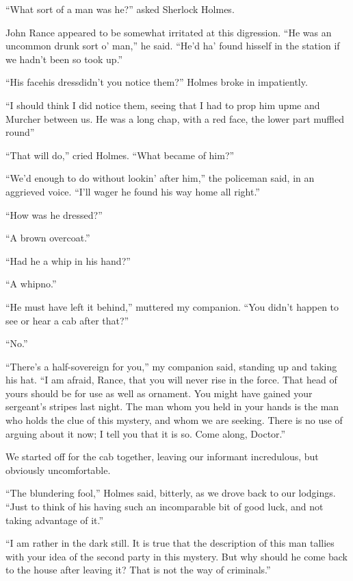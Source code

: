\documentclass[12pt,english]{book}
\begin{document}
{}``What sort of a man was he?'' asked Sherlock Holmes.

John Rance appeared to be somewhat irritated at this digression. {}``He
was an uncommon drunk sort o' man,'' he said. {}``He'd ha' found
hisself in the station if we hadn't been so took up.''

{}``His face\mdsh{---}his dress\mdsh{---}didn't you notice them?''
Holmes broke in impatiently.

{}``I should think I did notice them, seeing that I had to prop him
up\mdsh{---}me and Murcher between us. He was a long chap, with a
red face, the lower part muffled round\mdsh{---}''

{}``That will do,'' cried Holmes. {}``What became of him?''

{}``We'd enough to do without lookin' after him,'' the policeman
said, in an aggrieved voice. {}``I'll wager he found his way home
all right.''

{}``How was he dressed?''

{}``A brown overcoat.''

{}``Had he a whip in his hand?''

{}``A whip\mdsh{---}no.''

{}``He must have left it behind,'' muttered my companion. {}``You
didn't happen to see or hear a cab after that?''

{}``No.''

{}``There's a half-sovereign for you,'' my companion said, standing
up and taking his hat. {}``I am afraid, Rance, that you will never
rise in the force. That head of yours should be for use as well as
ornament. You might have gained your sergeant's stripes last night.
The man whom you held in your hands is the man who holds the clue
of this mystery, and whom we are seeking. There is no use of arguing
about it now; I tell you that it is so. Come along, Doctor.''

We started off for the cab together, leaving our informant incredulous,
but obviously uncomfortable.

{}``The blundering fool,'' Holmes said, bitterly, as we drove back
to our lodgings. {}``Just to think of his having such an incomparable
bit of good luck, and not taking advantage of it.''

{}``I am rather in the dark still. It is true that the description
of this man tallies with your idea of the second party in this mystery.
But why should he come back to the house after leaving it? That is
not the way of criminals.''
\end{document}
